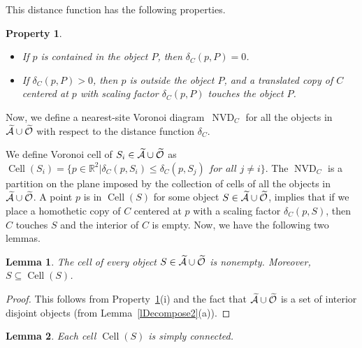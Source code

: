 \documentclass[a4paper,11pt]{article}
\newcommand{\IR}{\mathbb{R}}
\DeclareMathOperator{\NVD}{NVD}
\DeclareMathOperator{\Cell}{Cell}
\newtheorem{lemma}{Lemma}
\newtheorem{property}{Property}
\begin{document}
This distance function has the following properties.

\begin{property}\label{p5}
 \begin{itemize}
  \item[(i)] If $p$ is contained in the object $P$, then  
$\delta_{C}(p,P)=0$.
\item[(ii)] If $\delta_{C}(p,P)>0$, then $p$ is outside the object $P$, 
and a translated copy of $C$ centered at $p$ with 
 scaling factor $\delta_{C}(p,P)$  touches the object $P$.
 \end{itemize}

\end{property}

Now, we define a nearest-site Voronoi diagram~$\NVD_C$ for all 
the  objects in $\widetilde{\cal A}\cup \widetilde{\cal O}$ with respect 
to the distance 
function 
${\delta}_C$.
 
We define Voronoi cell of ${S}_i\in \widetilde{\cal A}\cup 
\widetilde{\cal O}$ as $\Cell({S}_i)=\{p\in \IR^2| {\delta}_C(p,{S}_i)\leq {\delta}_C(p,{S}_j) \textit{~for all } j\neq i\}$. The $\NVD_C$ is a partition on the plane 
 imposed by the collection of cells of all the objects in $\widetilde{\cal A}\cup 
\widetilde{\cal O}$.
A point $p$ is in $\Cell({S})$ for some object ${S}\in 
\widetilde{\cal A}\cup \widetilde{\cal O}$, 
implies that 
if we place a homothetic copy of $C$ centered at $p$ with a scaling factor 
$\delta_C(p,S)$, then $C$ touches  ${S}$ and the 
interior of $C$ is empty.
Now,  we have the following two lemmas.

 \begin{lemma}\label{lll1}
 The cell of every object ${S}\in \widetilde{\cal A}\cup 
\widetilde{\cal O}$ is nonempty. 
Moreover, 
  ${S} \subseteq  
\Cell({S})$. 
\end{lemma}
\begin{proof}

This follows from  Property~\ref{p5}(i) and the fact that $\widetilde{\cal A}\cup 
\widetilde{\cal O}$ is a set of 
interior disjoint  objects (from Lemma~\ref{lDecompose2}(a)).
\end{proof}

 
 \begin{lemma}\label{lll2}
 Each cell  $\Cell({S})$  is simply connected. 

\end{lemma}
\end{document}
